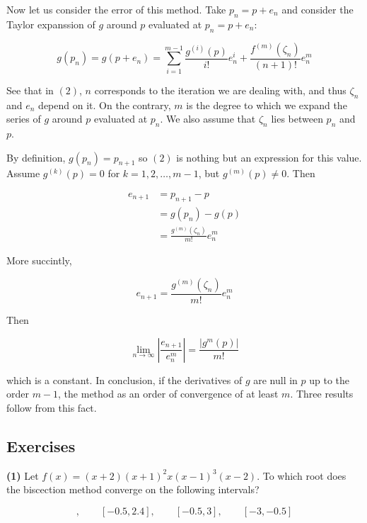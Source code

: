 \documentclass[12pt]{article}
\theoremstyle{definition}
\begin{document}
Now let us consider the error of this method. Take $p_n = p + e_n$ and consider
the Taylor expanssion of $g$ around $p$ evaluated at $p_n = p+e_n$:

\begin{equation}
    g(p_n) = g(p + e_n) = \sum_{i=1}^{m-1} \frac{ g^{(i)}(p) }{i!} e_n^{i} +
    \frac{f^{(m)}(\zeta_n)}{(n+1)!} e_{n}^{m}
\end{equation}

See that in $(2)$, $n$ corresponds to the iteration we are dealing with, and
thus $\zeta_n$ and $e_n$ depend on it. On the contrary, $m$ is the degree to
which we expand the series of $g$ around $p$ evaluated at $p_n$. We also assume
that $\zeta_n$ lies between $p_n$ and $p$.

By definition, $g(p_n) = p_{n+1}$ so $(2)$ is nothing but an expression for this
value. Assume $g^{(k)}(p) = 0$ for $k = 1, 2, \ldots, m-1$, but $g^{(m)}(p) \neq
0$. Then 

\begin{align*}
    e_{n+1} 
    &= p_{n+1} - p\\ 
    &=g(p_n) - g(p) \\ 
    &=\frac{ g^{(m)}\left( \zeta_n \right)  }{m!}e_n^m 
\end{align*}

More succintly,

\begin{equation*}
    e_{n+1} = \frac{ g^{(m)}\left( \zeta_n \right)  }{m!}e_n^m 
\end{equation*}

Then 

\begin{equation*}
    \lim_{n \to \infty} \left| \frac{e_{n+1}}{e_n^m} \right|  = 
    \frac{\left| g^m(p) \right| }{m!}
\end{equation*}

which is a constant. In conclusion, if the derivatives of $g$ are null in $p$ up
to the order $m-1$, the method as an order of convergence of at least $m$. Three
results follow from this fact. 

\pagebreak 


\subsection{Exercises}

\begin{shaded}
    \textbf{(1)} Let $f(x) = (x+2)(x+1)^2 x(x-1)^3(x-2)$. To which root does
    the biscection method converge on the following intervals? 

    \begin{equation*}
        [-1.5, 2.5], \qquad [-0.5, 2.4], \qquad [-0.5, 3], \qquad [-3, -0.5]
    \end{equation*}
\end{shaded}
\end{document}
